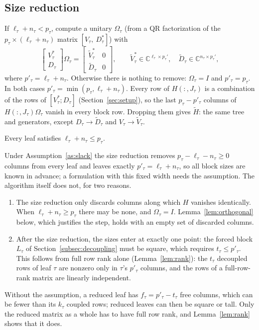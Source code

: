 \subsection{Size reduction}\label{subsec:sizereduction}
If $\ell_\tau+n_\tau<p_\tau$, compute a unitary $\Omega_\tau$ (from a QR factorization of the
$p_\tau\times(\ell_\tau+n_\tau)$ matrix $[V_\tau,\ D_\tau^*]$) with
\begin{equation}\label{eq:sizered}
\begin{bmatrix}V_\tau^*\\ D_\tau\end{bmatrix}\Omega_\tau=
\begin{bmatrix}\tilde V_\tau^* & 0\\ \tilde D_\tau & 0\end{bmatrix},\qquad
\tilde V_\tau^*\in\mathbb{C}^{\ell_\tau\times p_\tau'},\quad \tilde D_\tau\in\mathbb{C}^{n_\tau\times p_\tau'},
\end{equation}
where $p'_\tau=\ell_\tau+n_\tau$. Otherwise there is nothing to remove: $\Omega_\tau=I$ and
$p'_\tau=p_\tau$. In both cases $p'_\tau=\min(p_\tau,\ell_\tau+n_\tau)$. Every row of $H(:,J_\tau)$ is a
combination of the rows of $[V_\tau^*;D_\tau]$ (Section~\ref{sec:setup}), so the last $p_\tau-p'_\tau$
columns of $H(:,J_\tau)\Omega_\tau$ vanish in every block row. Dropping them gives $\tilde H$: the same
tree and generators, except $D_\tau\to\tilde D_\tau$ and $V_\tau\to\tilde V_\tau$.

\begin{assumption}[slack]\label{as:slack}
Every leaf satisfies $\ell_\tau+n_\tau\le p_\tau$.
\end{assumption}
\noindent Under Assumption~\ref{as:slack} the size reduction removes $p_\tau-\ell_\tau-n_\tau\ge0$ columns from
every leaf and leaves exactly $p'_\tau=\ell_\tau+n_\tau$, so all block sizes are known in advance; a
formulation with this fixed width needs the assumption. The algorithm itself does not, for two
reasons.
\begin{enumerate}[leftmargin=1.5em,itemsep=1pt]
\item The size reduction only discards columns along which $H$ vanishes identically. When
$\ell_\tau+n_\tau\ge p_\tau$ there may be none, and $\Omega_\tau=I$. Lemma~\ref{lem:orthogonal} below, which
justifies the step, holds with an empty set of discarded columns.
\item After the size reduction, the sizes enter at exactly one point: the forced block $L_\tau$ of
Section~\ref{subsec:decoupling} must be square, which requires $t_\tau\le p'_\tau$. This follows from
full row rank alone (Lemma~\ref{lem:rank}): the $t_\tau$ decoupled rows of leaf $\tau$ are nonzero only
in $\tau$'s $p'_\tau$ columns, and the rows of a full-row-rank matrix are linearly independent.
\end{enumerate}
Without the assumption, a reduced leaf has $f_\tau=p'_\tau-t_\tau$ free columns, which can be fewer
than its $k_\tau$ coupled rows; reduced leaves can then be square or tall. Only the reduced matrix as a
whole has to have full row rank, and Lemma~\ref{lem:rank} shows that it does.

